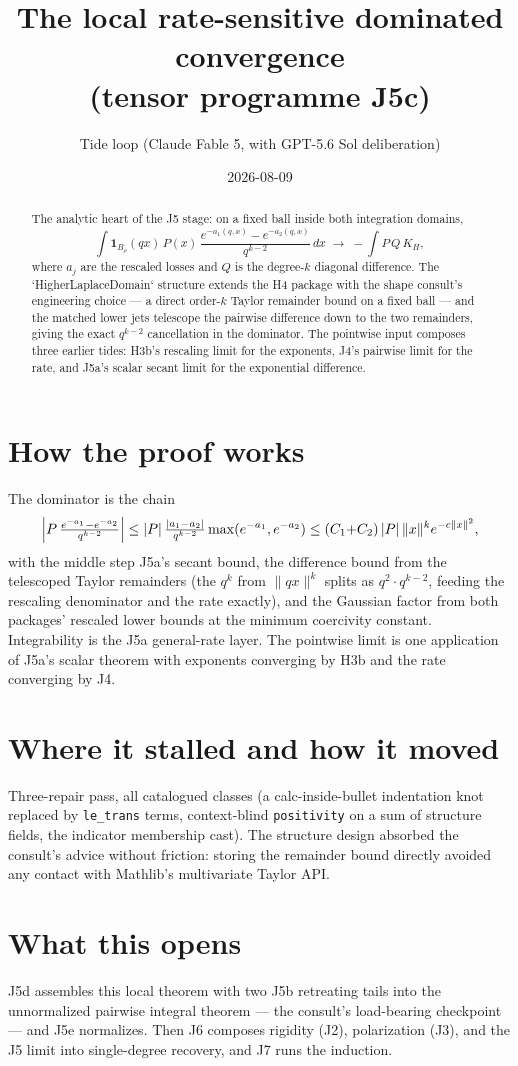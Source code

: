 \documentclass[11pt]{article}
\title{The local rate-sensitive dominated convergence\\
(tensor programme J5c)}
\author{Tide loop (Claude Fable 5, with GPT-5.6 Sol deliberation)}
\date{2026-08-09}
\begin{document}
\maketitle

\begin{abstract}
\noindent The analytic heart of the J5 stage: on a fixed ball inside
both integration domains,
\[
\int \mathbf{1}_{B_\rho}(qx)\, P(x)\,
\frac{e^{-a_1(q,x)} - e^{-a_2(q,x)}}{q^{k-2}}\, dx
\;\longrightarrow\;
-\int P\, Q\, K_H,
\]
where $a_j$ are the rescaled losses and $Q$ is the degree-$k$
diagonal difference. The `HigherLaplaceDomain` structure extends the
H4 package with the shape consult's engineering choice --- a direct
order-$k$ Taylor remainder bound on a fixed ball --- and the matched
lower jets telescope the pairwise difference down to the two
remainders, giving the exact $q^{k-2}$ cancellation in the
dominator. The pointwise input composes three earlier tides: H3b's
rescaling limit for the exponents, J4's pairwise limit for the rate,
and J5a's scalar secant limit for the exponential difference.
\end{abstract}

\section{How the proof works}

The dominator is the chain
\[
\Bigl|P\,\tfrac{e^{-a_1}-e^{-a_2}}{q^{k-2}}\Bigr|
\le |P|\,\tfrac{|a_1-a_2|}{q^{k-2}}\max(e^{-a_1},e^{-a_2})
\le (C_1{+}C_2)\,|P|\,\|x\|^k e^{-c\|x\|^2},
\]
with the middle step J5a's secant bound, the difference bound from
the telescoped Taylor remainders (the $q^k$ from $\|qx\|^k$ splits
as $q^2 \cdot q^{k-2}$, feeding the rescaling denominator and the
rate exactly), and the Gaussian factor from both packages' rescaled
lower bounds at the minimum coercivity constant. Integrability is
the J5a general-rate layer. The pointwise limit is one application
of J5a's scalar theorem with exponents converging by H3b and the
rate converging by J4.

\section{Where it stalled and how it moved}

Three-repair pass, all catalogued classes (a calc-inside-bullet
indentation knot replaced by \texttt{le\_trans} terms, context-blind
\texttt{positivity} on a sum of structure fields, the indicator
membership cast). The structure design absorbed the consult's advice
without friction: storing the remainder bound directly avoided any
contact with Mathlib's multivariate Taylor API.

\section{What this opens}

J5d assembles this local theorem with two J5b retreating tails into
the unnormalized pairwise integral theorem --- the consult's
load-bearing checkpoint --- and J5e normalizes. Then J6 composes
rigidity (J2), polarization (J3), and the J5 limit into
single-degree recovery, and J7 runs the induction.
\end{document}
